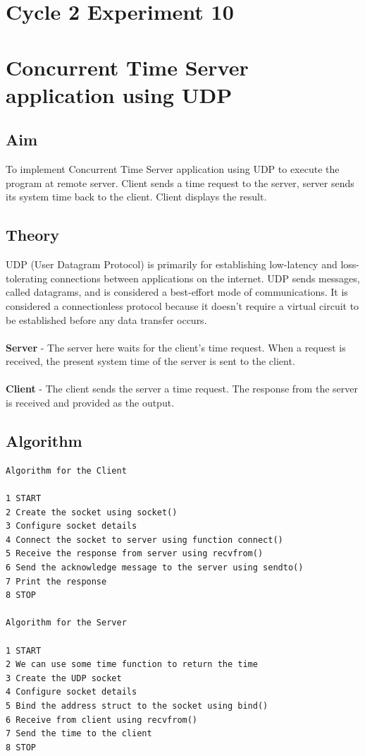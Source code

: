 \section*{Cycle 2 Experiment 10}

\section{\Large{Concurrent Time Server application using UDP}}

\subsection{Aim}
\large To implement Concurrent Time Server application using UDP to execute the program at remote server. Client sends a time request to the server, server sends its system time back to the client. Client displays the result.

\subsection{Theory}
UDP (User Datagram Protocol) is primarily for establishing low-latency and loss-tolerating connections between applications on the internet. UDP sends messages, called datagrams, and is considered a best-effort mode of communications. It is considered a connectionless protocol because it doesn’t require a virtual circuit to be established before any data transfer occurs. \\ \\
\textbf{Server} - The server here waits for the client’s time request. When a request is received, the present system time of the server is sent to the client.\\ \\
\textbf{Client} - The client sends the server a time request. The response from the server is received and provided as the output.
\subsection{Algorithm}
\begin{verbatim}
Algorithm for the Client

1 START
2 Create the socket using socket()
3 Configure socket details
4 Connect the socket to server using function connect()
5 Receive the response from server using recvfrom()
6 Send the acknowledge message to the server using sendto()
7 Print the response
8 STOP

Algorithm for the Server

1 START
2 We can use some time function to return the time
3 Create the UDP socket
4 Configure socket details
5 Bind the address struct to the socket using bind()
6 Receive from client using recvfrom()
7 Send the time to the client
8 STOP
\end{verbatim}


